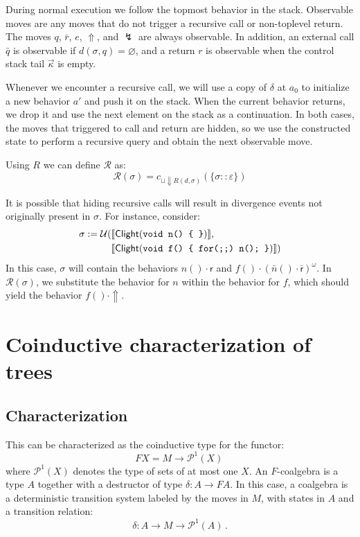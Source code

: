 \documentclass[11pt]{article}
\newcommand{\kw}[1]{{\mathsf{#1}}}
\begin{document}
During normal execution we follow the topmost behavior in the stack.
Observable moves are any moves that do not trigger a recursive call
or non-toplevel return.
The moves $q$, $\bar{r}$, $e$, $\Uparrow$, and $\lightning$
are always observable.
In addition,
an external call $\bar{q}$
is observable if $d(\sigma, q) = \varnothing$,
and a return $r$
is observable when the control stack tail $\vec{\kappa}$ is empty.

Whenever we encounter a recursive call,
we will use a copy of $\delta$ at $a_0$
to initialize a new behavior $a'$ and push it on the stack.
When the current behavior returns,
we drop it and use the next element on the stack as a continuation.
In both cases,
the moves that triggered to call and return are hidden,
so we use the constructed state to perform a recursive query
and obtain the next observable move.

Using $R$ we can define $\mathcal{R}$ as:
\[ \mathcal{R}(\sigma) = c_{\sqcup \Downarrow R(d, \sigma)}(\{ \sigma :: \varepsilon \}) \]

It is possible that hiding recursive calls
will result in divergence events not originally present in $\sigma$.
For instance, consider:
\begin{align*}
  \sigma := \mathcal{U}(&\llbracket \kw{Clight}(\mbox{\tt void n() \{ \}}) \rrbracket, \\
 &\llbracket \kw{Clight}(\mbox{\tt void f() \{ for(;;) n(); \}}) \rrbracket)
\end{align*}
In this case, $\sigma$ will contain the behaviors
$n() \cdot \kw{r}$ and $f() \cdot (\bar{n}() \cdot \bar{\kw{r}})^\omega$.
In $\mathcal{R}(\sigma)$,
we substitute the behavior for $n$ within the behavior for $f$,
which should yield the behavior $f() \cdot \Uparrow$.




\appendix

\section{Coinductive characterization of trees}
\label{sec:treecoind}

\subsection{Characterization}

This can be characterized as the coinductive type for the functor:
\[ F X = M \rightarrow \mathcal{P}^1(X)\, \]
where $\mathcal{P}^1(X)$ denotes the type of sets of at most one $X$.
An $F$-coalgebra is a type $A$
together with a destructor of type $\delta : A \rightarrow F A$.
In this case, a coalgebra is a deterministic transition system
labeled by the moves in $M$,
with states in $A$ and a transition relation:
\[ \delta : A \rightarrow M \rightarrow \mathcal{P}^1(A) \, . \]
\end{document}
